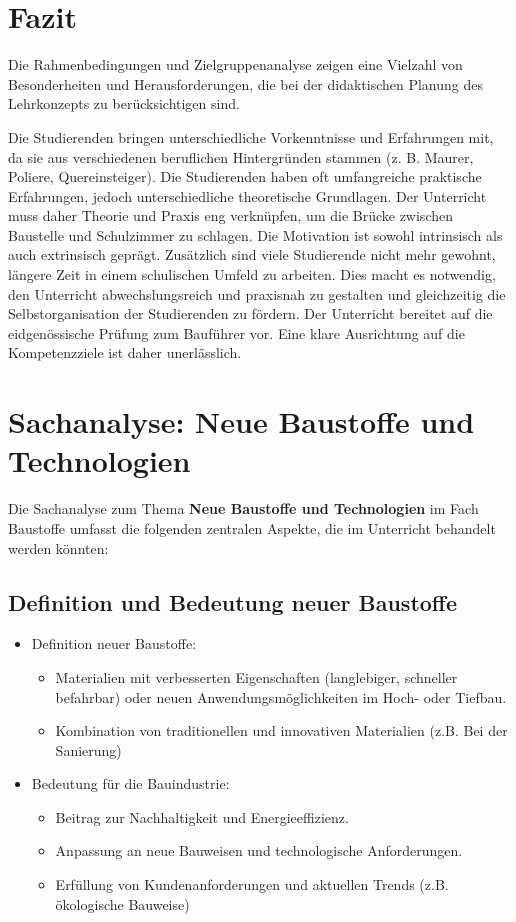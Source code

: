 \documentclass[
11pt,
captions=tableheading,
smallheadings,
headsepline,
footsepline, 
captions=tableheading,
parskip=half-,
]{scrartcl}
\begin{document}
\section*{Fazit}
Die Rahmenbedingungen und Zielgruppenanalyse zeigen eine Vielzahl von Besonderheiten und Herausforderungen, die bei der didaktischen Planung des Lehrkonzepts zu berücksichtigen sind.

Die Studierenden bringen unterschiedliche Vorkenntnisse und Erfahrungen mit, da sie aus verschiedenen beruflichen Hintergründen stammen (z. B. Maurer, Poliere, Quereinsteiger). 
Die Studierenden haben oft umfangreiche praktische Erfahrungen, jedoch unterschiedliche theoretische Grundlagen. Der Unterricht muss daher Theorie und Praxis eng verknüpfen, um die Brücke zwischen Baustelle und Schulzimmer zu schlagen.
Die Motivation ist sowohl intrinsisch als auch extrinsisch geprägt. Zusätzlich sind viele Studierende nicht mehr gewohnt, längere Zeit in einem schulischen Umfeld zu arbeiten. Dies macht es notwendig, den Unterricht abwechslungsreich und praxisnah zu gestalten und gleichzeitig die Selbstorganisation der Studierenden zu fördern.
Der Unterricht bereitet auf die eidgenössische Prüfung zum Bauführer vor. Eine klare Ausrichtung auf die Kompetenzziele ist daher unerlässlich. 



\section{Sachanalyse: Neue Baustoffe und Technologien}
\label{sec:Sachanalyse}

Die Sachanalyse zum Thema \textbf{Neue Baustoffe und Technologien} im Fach Baustoffe umfasst die folgenden zentralen Aspekte, die im Unterricht behandelt werden könnten:

\subsection{Definition und Bedeutung neuer Baustoffe}
\begin{itemize}
    \item Definition neuer Baustoffe:
    \begin{itemize}
        \item Materialien mit verbesserten Eigenschaften (langlebiger, schneller befahrbar) oder neuen Anwendungsmöglichkeiten im Hoch- oder Tiefbau.
        \item Kombination von traditionellen und innovativen Materialien (z.B. Bei der Sanierung)
    \end{itemize}
    \item Bedeutung für die Bauindustrie:
    \begin{itemize}
        \item Beitrag zur Nachhaltigkeit und Energieeffizienz.
        \item Anpassung an neue Bauweisen und technologische Anforderungen.
        \item Erfüllung von Kundenanforderungen und aktuellen Trends (z.B. ökologische Bauweise)
    \end{itemize}
\end{itemize}
\end{document}
